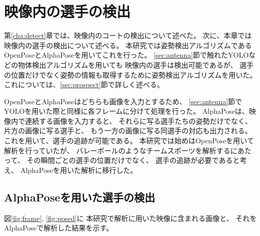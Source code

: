 \documentclass[a4j, fleqn, 12pt]{jsreport}
\begin{document}
\chapter{映像内の選手の検出} \label{cha:pose}
    第\ref{cha:detect}章では、映像内のコートの検出について述べた。
    次に、本章では映像内の選手の検出について述べる。
    本研究では姿勢検出アルゴリズムである
    OpenPose\cite{Zhe}とAlphaPose\cite{Hao}を用いてこれを行った。
    \ref{sec:antenna}節で触れたYOLOなどの物体検出アルゴリズムを用いても
    映像内の選手は検出可能であるが、
    選手の位置だけでなく姿勢の情報も取得するために姿勢検出アルゴリズムを用いた。
    これについては、\ref{sec:prospect}節で詳しく述べる。

    OpenPoseとAlphaPoseはどちらも画像を入力とするため、
    \ref{sec:antenna}節でYOLOを用いた際と同様に各フレームに分けて処理を行った。
    AlphaPoseは、映像内で連続する画像を入力すると、
    それらに写る選手たちの姿勢だけでなく、
    片方の画像に写る選手と、
    もう一方の画像に写る同選手の対応も出力される。
    これを用いて、選手の追跡が可能である。
    本研究では始めはOpenPoseを用いて解析を行っていたが、
    バレーボールのようなチームスポーツを解析するにあたって、
    その瞬間ごとの選手の位置だけでなく、
    選手の追跡が必要であると考え、
    AlphaPoseを用いた解析に移行した。

    \section{AlphaPoseを用いた選手の検出}
        図\ref{fig:frame}, \ref{fig:posed}に
        本研究で解析に用いた映像に含まれる画像と、
        それをAlphaPoseで解析した結果を示す。
\end{document}
